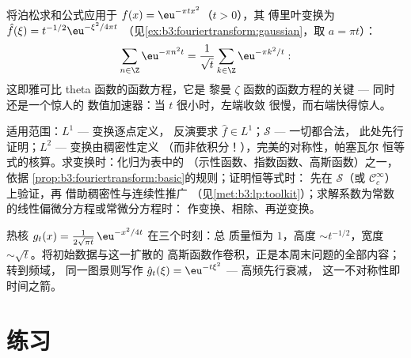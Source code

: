 \begin{example}
\label{ex:b3:fouriertransform:theta}
将泊松求和公式应用于 $f(x) = \eu^{-\pi tx^2}$（$t > 0$），其
傅里叶变换为 $\hat f(\xi) = t^{-1/2}\eu^{-\xi^2/4\pi t}$
（见\cref{ex:b3:fouriertransform:gaussian}，取 $a = \pi t$）：
\[
\sum_{n\in\Z}\eu^{-\pi n^2t}
= \frac1{\sqrt t}\sum_{k\in\Z}\eu^{-\pi k^2/t} :
\]
这即雅可比 theta 函数的函数方程，它是
黎曼 $\zeta$ 函数的函数方程的关键 --- 同时还是一个惊人的
数值加速器：当 $t$ 很小时，左端收敛
很慢，而右端快得惊人。
\end{example}

\begin{method}\label{met:b3:fouriertransform:method}
适用范围：$L^1$ --- 变换逐点定义，
反演要求 $\hat f \in L^1$；$\mathcal S$ --- 一切都合法，
此处先行证明；$L^2$ --- 变换由稠密性定义
（而非依积分！），完美的对称性，帕塞瓦尔
恒等式的核算。求变换时：化归为表中的
（示性函数、指数函数、高斯函数）之一，依据
\cref{prop:b3:fouriertransform:basic}的规则；证明恒等式时：
先在 $\mathcal S$（或 $\mathcal C_c^\infty$）上验证，再
借助稠密性与连续性推广
（见\cref{met:b3:lp:toolkit}）；求解系数为常数的线性偏微分方程或常微分方程时：
作变换、相除、再逆变换。
\end{method}

\begin{omfigure}

{\small 热核 $g_t(x) =
\frac1{2\sqrt{\pi t}}\,\eu^{-x^2/4t}$ 在三个时刻：总
质量恒为 $1$，高度 $\sim t^{-1/2}$，宽度 $\sim
\sqrt t$。将初始数据与这一扩散的
高斯函数作卷积，正是本周末问题的全部内容；转到频域，
同一图景则写作
$\hat g_t(\xi) = \eu^{-t\xi^2}$ --- 高频先行衰减，
这一不对称性即时间之箭。}
\end{omfigure}

\section{练习}

